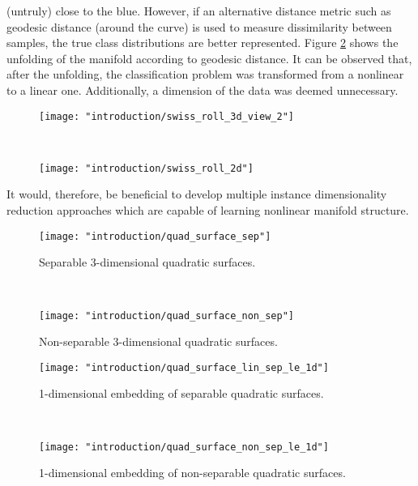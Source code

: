 (untruly) close to the blue.  However, if an alternative distance metric such as geodesic distance (around the curve) is used to measure dissimilarity between samples, the true class distributions are better represented.  Figure \ref{fig:swiss_roll_2d} shows the unfolding of the manifold according to geodesic distance.  It can be observed that, after the unfolding, the classification problem was transformed from a nonlinear to a linear one.  Additionally, a dimension of the data was deemed unnecessary.
\begin{figure*}[t!]
	\centering
	\begin{subfigure}[t]{0.5\textwidth}
		\centering
		\texttt{[image: "introduction/swiss\_roll\_3d\_view\_2"]}
		\caption{}
		\label{fig:swiss_roll_3d}
	\end{subfigure}%
	~ 
	\begin{subfigure}[t]{0.5\textwidth}
		\centering
		\texttt{[image: "introduction/swiss\_roll\_2d"]}
		\caption{}
		\label{fig:swiss_roll_2d}
	\end{subfigure}
	\caption[Swiss Roll manifold unfolding.]{(a) This dataset is known as the Swiss Roll and it depicts a 2-dimensional manifold embedded in 3 dimensions.  (b) The Swiss Roll unfolded according to the geodesic path around the manifold.}
	\label{fig:swiss_roll}%
\end{figure*}  
It would, therefore, be beneficial to develop multiple instance dimensionality reduction approaches which are capable of learning nonlinear manifold structure.  

\begin{figure*}[h!]
	\centering
	\begin{subfigure}[t]{0.5\textwidth}
		\centering
		\texttt{[image: "introduction/quad\_surface\_sep"]}
		\caption{Separable 3-dimensional quadratic surfaces.}
		\label{fig:quad_surface_sep}
	\end{subfigure}%
	~ 
	\begin{subfigure}[t]{0.5\textwidth}
		\centering
		\texttt{[image: "introduction/quad\_surface\_non\_sep"]}
		\caption{Non-separable 3-dimensional quadratic surfaces.}
		\label{fig:quad_surface_non_sep}
	\end{subfigure}
	
	
	\begin{subfigure}[t]{0.5\textwidth}
		\centering
		\texttt{[image: "introduction/quad\_surface\_lin\_sep\_le\_1d"]}
		\caption{1-dimensional embedding of separable quadratic surfaces.}
		\label{fig:quad_surface_sep_le_1d}
	\end{subfigure}%
	~ 
	\begin{subfigure}[t]{0.5\textwidth}
		\centering
		\texttt{[image: "introduction/quad\_surface\_non\_sep\_le\_1d"]}
		\caption{1-dimensional embedding of non-separable quadratic surfaces.}
		\label{fig:quad_surface_non_sep_le_1d}
	\end{subfigure}
	\caption[Unsupervised embedding of quadratic surfaces]{Unsupervised embedding of quadratic surfaces using Laplacian Eigenmaps with a $K$-nearest neighbors graph.}
	\label{fig:quad_surfaces_no_labels}%
\end{figure*} 

